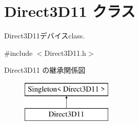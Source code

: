 \hypertarget{class_d3_d11_1_1_direct3_d11}{}\section{Direct3\+D11 クラス}
\label{class_d3_d11_1_1_direct3_d11}


Direct3\+D11デバイスclass.  




{\ttfamily \#include $<$Direct3\+D11.\+h$>$}

Direct3\+D11 の継承関係図\begin{figure}[H]
\begin{center}
\leavevmode
\includegraphics[height=2.000000cm]{class_d3_d11_1_1_direct3_d11}
\end{center}
\end{figure}
